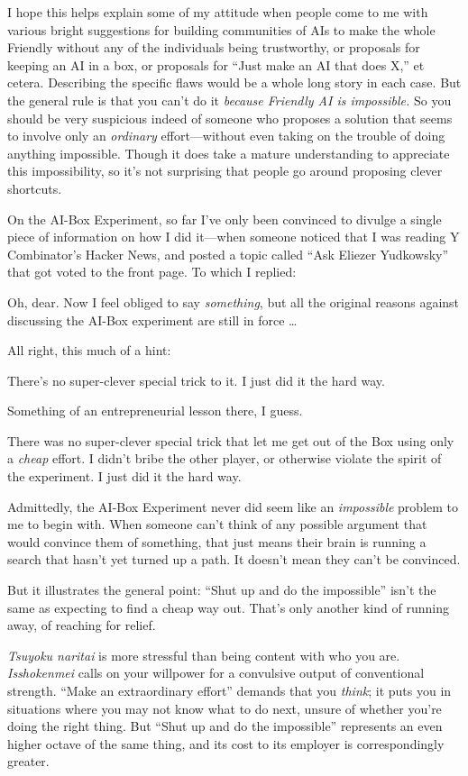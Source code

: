 {
 I hope this helps explain some of my attitude when people come to
me with various bright suggestions for building communities of AIs to
make the whole Friendly without any of the individuals being
trustworthy, or proposals for keeping an AI in a box, or proposals for
``Just make an AI that does X,'' et
cetera. Describing the specific flaws would be a whole long story in
each case. But the general rule is that you can't do it
\textit{because Friendly AI is impossible.} So you should be very
suspicious indeed of someone who proposes a solution that seems to
involve only an \textit{ordinary} effort---without even taking on the
trouble of doing anything impossible. Though it does take a mature
understanding to appreciate this impossibility, so it's
not surprising that people go around proposing clever shortcuts.}

{
 On the AI-Box Experiment, so far I've only been
convinced to divulge a single piece of information on how I did
it---when someone noticed that I was reading Y
Combinator's Hacker News, and posted a topic called
``Ask Eliezer Yudkowsky'' that got
voted to the front page. To which I replied:}

{
 Oh, dear. Now I feel obliged to say \textit{something}, but all
the original reasons against discussing the AI-Box experiment are still
in force \ldots}

{
 All right, this much of a hint:}

{
 There's no super-clever special trick to it. I
just did it the hard way.}

{
 Something of an entrepreneurial lesson there, I guess.}

{
 There was no super-clever special trick that let me get out of the
Box using only a \textit{cheap} effort. I didn't bribe
the other player, or otherwise violate the spirit of the experiment. I
just did it the hard way.}

{
 Admittedly, the AI-Box Experiment never did seem like an
\textit{impossible} problem to me to begin with. When someone
can't think of any possible argument that would
convince them of something, that just means their brain is running a
search that hasn't yet turned up a path. It
doesn't mean they can't be convinced.}

{
 But it illustrates the general point: ``Shut up
and do the impossible'' isn't the
same as expecting to find a cheap way out. That's only
another kind of running away, of reaching for relief.}

{
 \textit{Tsuyoku naritai} is more stressful than being content with
who you are. \textit{Isshokenmei} calls on your willpower for a
convulsive output of conventional strength. ``Make an
extraordinary effort'' demands that you
\textit{think}; it puts you in situations where you may not know what
to do next, unsure of whether you're doing the right
thing. But ``Shut up and do the
impossible'' represents an even higher octave of the
same thing, and its cost to its employer is correspondingly greater.}

